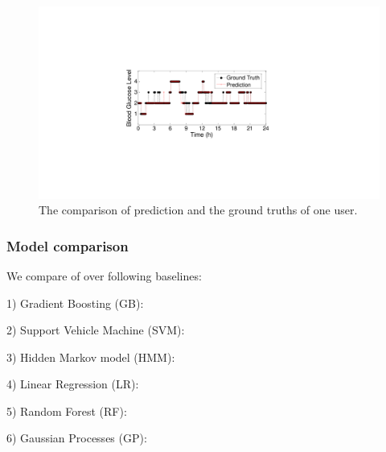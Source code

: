 \begin{figure}[!t]
\centering
\includegraphics[width=0.5\columnwidth]{./img/pred_vs_gt.pdf}
\caption{The comparison of prediction and the ground truths of one user.}
\label{fig:pre_gt}
\end{figure}


\subsubsection{Model comparison}

We compare \modelname of \sysname over following baselines:

1) Gradient Boosting (GB):

2) Support Vehicle Machine (SVM):

3) Hidden Markov model (HMM):

4) Linear Regression (LR):

5) Random Forest (RF):

6) Gaussian Processes (GP):





